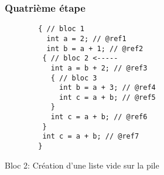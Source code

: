 \documentclass{../../res/univ-projet}
\begin{document}
    \subsubsection{Quatrième étape}
    \begin{multicols}{2}
        
        \begin{verbatim}
        { // bloc 1
          int a = 2; // @ref1
          int b = a + 1; // @ref2
         { // bloc 2 <-----
           int a = b + 2; // @ref3
           { // bloc 3
             int b = a + 3; // @ref4
             int c = a + b; // @ref5
           }
           int c = a + b; // @ref6
         }
         int c = a + b; // @ref7
        }

        \end{verbatim}

      \columnbreak
        Bloc 2: Création d'une liste vide sur la pile
        
      \end{multicols}
\end{document}
